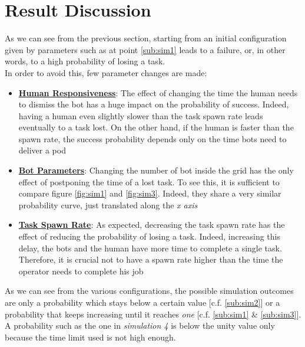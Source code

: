 \documentclass{article}
\begin{document}
	\section{Result Discussion}
			As we can see from the previous section, starting from an initial configuration given by parameters such as at point \ref{sub:sim1} leads to a failure, or, in other words, to a high probability of losing a task.\\In order to avoid this, few parameter changes are made:
			\begin{itemize}
				\item {\textbf{\underline{Human Responsiveness}}: The effect of changing the time the human needs to dismiss the bot has a huge impact on the probability of success. Indeed, having a human even slightly slower than the task spawn rate leads eventually to a task lost. On the other hand, if the human is faster than the spawn rate, the success probability depends only on the time bots need to deliver a pod}
				\item {\textbf{\underline{Bot Parameters}}: Changing the number of bot inside the grid has the only effect of postponing the time of a lost task. To see this, it is sufficient to compare figure \ref{fig:sim1} and \ref{fig:sim3}. Indeed, they share a very similar probability curve, just translated along the \emph{x axis}}
				\item {\textbf{\underline{Task Spawn Rate}}:} As expected, decreasing the task spawn rate has the effect of reducing the probability of losing a task. Indeed, increasing this delay, the bots and the human have more time to complete a single task. Therefore, it is crucial not to have a spawn rate higher than the time the operator needs to complete his job
			\end{itemize}
			As we can see from the various configurations, the possible simulation outcomes are only a probability which stays below a certain value [c.f. \ref{sub:sim2}] or a probability that keeps increasing until it reaches \emph{one} [c.f. \ref{sub:sim1} \& \ref{sub:sim3}]. A probability such as the one in \emph{simulation 4} is below the unity value only because the time limit used is not high enough.
			
\end{document}
